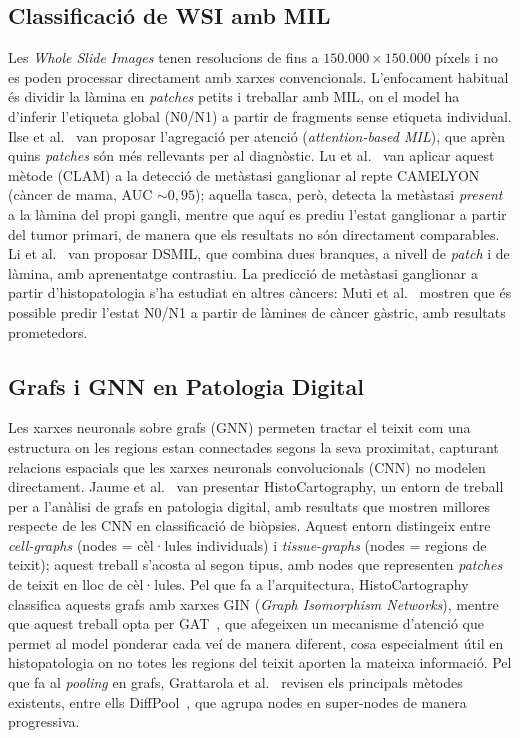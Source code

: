 \documentclass[10pt,a4paper,twocolumn,twoside]{article}
\begin{document}
\subsection{Classificació de WSI amb MIL}

Les \textit{Whole Slide Images} tenen resolucions de fins a $150.000 \times 150.000$
píxels i no es poden processar directament amb xarxes convencionals. L'enfocament habitual
és dividir la làmina en \textit{patches} petits i treballar amb MIL, on el model ha
d'inferir l'etiqueta global (N0/N1) a partir de fragments sense
etiqueta individual. Ilse et al.~\cite{ilse2018attentionbaseddeepmultipleinstance} van
proposar l'agregació per atenció (\textit{attention-based MIL}), que aprèn quins
\textit{patches} són més rellevants per al diagnòstic. Lu et al.~\cite{lu2020dataefficientweaklysupervised}
van aplicar aquest mètode (CLAM) a la detecció de metàstasi ganglionar al repte CAMELYON
(càncer de mama, AUC $\sim\!0{,}95$); aquella tasca, però, detecta la metàstasi \emph{present}
a la làmina del propi gangli, mentre que aquí es prediu l'estat ganglionar a partir del tumor
primari, de manera que els resultats no són directament comparables. Li et
al.~\cite{li2021dualstreammultipleinstancelearning} van proposar DSMIL, que combina dues
branques, a nivell de \textit{patch} i de làmina, amb aprenentatge contrastiu. La
predicció de metàstasi ganglionar a partir d'histopatologia s'ha estudiat en altres càncers:
Muti et al.~\cite{muti2023deep} mostren que és possible predir l'estat N0/N1 a partir de
làmines de càncer gàstric, amb resultats prometedors.

\subsection{Grafs i GNN en Patologia Digital}

Les xarxes neuronals sobre grafs (GNN) permeten
tractar el teixit com una estructura on les
regions estan connectades segons la seva proximitat, capturant relacions espacials que les
xarxes neuronals convolucionals (CNN) no modelen directament. Jaume et al.~\cite{jaume2021histocartographytoolkitgraphanalytics}
van presentar HistoCartography, un entorn de treball per a l'anàlisi de grafs en patologia
digital, amb resultats que mostren millores respecte de les CNN en classificació de
biòpsies. Aquest entorn distingeix entre \textit{cell-graphs} (nodes = cèl·lules
individuals) i \textit{tissue-graphs} (nodes = regions de teixit); aquest treball s'acosta
al segon tipus, amb nodes que representen \textit{patches} de teixit en lloc de cèl·lules.
Pel que fa a l'arquitectura, HistoCartography classifica aquests grafs amb xarxes GIN
(\textit{Graph Isomorphism Networks}), mentre que aquest treball opta per
GAT~\cite{veličković2018graphattentionnetworks}, que afegeixen un mecanisme d'atenció que
permet al model ponderar cada veí de manera diferent, cosa especialment útil en
histopatologia on no totes les regions del teixit aporten la mateixa informació. Pel que
fa al \textit{pooling} en grafs, Grattarola et al.~\cite{Grattarola_2024} revisen els
principals mètodes existents, entre ells DiffPool~\cite{ying2019hierarchicalgraphrepresentationlearning},
que agrupa nodes en super-nodes de manera progressiva.
\end{document}
